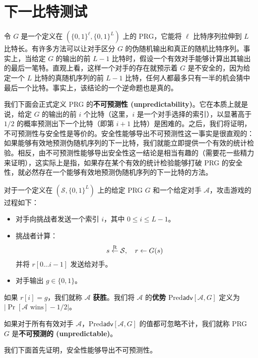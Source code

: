 \section{下一比特测试}

令 $G$ 是一个定义在 $(\{0,1\}^\ell,\{0,1\}^L)$ 上的 PRG，它能将 $\ell$ 比特序列拉伸到 $L$ 比特长。有许多方法可以让对手区分 $G$ 的伪随机输出和真正的随机比特序列。事实上，当给定 $G$ 的输出的前 $L-1$ 比特时，假设一个有效对手能够计算出其输出的最后一笔特。直观上看，这样一个对手的存在就预示着 $G$ 是不安全的，因为给定一个 $L$ 比特的真随机序列的前 $L-1$ 比特，任何人都最多只有一半的机会猜中最后一个比特。事实上，该结论的一个逆命题也是真的。

我们下面会正式定义 PRG 的\textbf{不可预测性 (unpredictability)}。它在本质上就是说，给定 $G$ 的输出的前 $i$ 个比特（这里，$i$ 是一个对手选择的索引），以显著高于 $1/2$ 的概率预测出下一个比特（即第 $i+1$ 比特）是困难的。之后，我们将证明，不可预测性与安全性是等价的。安全性能够导出不可预测性这一事实是很直观的：如果能够有效地预测伪随机序列的下一比特，我们就能立即提供一个有效的统计检验。相反，由不可预测性能够导出安全性这一结论是相当有趣的（需要花一些精力来证明），这实际上是指，如果存在某个有效的统计检验能够打破 PRG 的安全性，就必然存在一个能够有效地预测伪随机序列的下一比特的方法。

\begin{game}\label{game:3-2}
对于一个定义在 $(\mathcal{S},\{0,1\}^L)$ 上的给定 PRG $G$ 和一个给定对手 $\mathcal{A}$，攻击游戏的过程如下：
\begin{itemize}
	\item 对手向挑战者发送一个索引 $i$，其中 $0\leq i\leq L-1$。
	\item 挑战者计算：
	\[
	s\overset{\rm R}\leftarrow\mathcal{S},
	\quad
	r\leftarrow G(s)
	\]
	并将 $r[0\dots i-1]$ 发送给对手。
	\item 对手输出 $g\in\{0,1\}$。
\end{itemize}
如果 $r[i]=g$，我们就称 $\mathcal{A}$ \textbf{获胜}。我们将 $\mathcal{A}$ 的\textbf{优势} $\mathrm{Pred}\mathsf{adv}[\mathcal{A},G]$ 定义为 $|\Pr[\mathcal{A}\text{ wins}]-1/2|$。
\end{game}

\begin{definition}
如果对于所有有效对手 $\mathcal{A}$，$\mathrm{Pred}\mathsf{adv}[\mathcal{A},G]$ 的值都可忽略不计，我们就称 PRG $G$ 是\textbf{不可预测的 (unpredictable)}。
\end{definition}

我们下面首先证明，安全性能够导出不可预测性。

